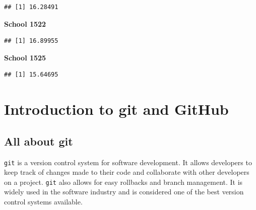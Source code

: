 \documentclass[
  12pt,
]{book}
\newenvironment{Shaded}{\begin{snugshade}}{\end{snugshade}}
\newcommand{\AttributeTok}[1]{\textcolor[rgb]{0.77,0.63,0.00}{#1}}
\newcommand{\DecValTok}[1]{\textcolor[rgb]{0.00,0.00,0.81}{#1}}
\newcommand{\FunctionTok}[1]{\textcolor[rgb]{0.00,0.00,0.00}{#1}}
\newcommand{\NormalTok}[1]{#1}
\newcommand{\SpecialCharTok}[1]{\textcolor[rgb]{0.00,0.00,0.00}{#1}}
\begin{document}
\begin{verbatim}
## [1] 16.28491
\end{verbatim}

\textbf{School 1522}

\begin{Shaded}
\end{Shaded}

\begin{verbatim}
## [1] 16.89955
\end{verbatim}

\textbf{School 1525}

\begin{Shaded}
\end{Shaded}

\begin{verbatim}
## [1] 15.64695
\end{verbatim}

\hypertarget{intro-git}{%
\chapter{Introduction to git and GitHub}\label{intro-git}}

\hypertarget{all-about-git}{%
\section{All about git}\label{all-about-git}}

\texttt{git} is a version control system for software development. It allows developers to keep track of changes made to their code and collaborate with other developers on a project. \texttt{git} also allows for easy rollbacks and branch management. It is widely used in the software industry and is considered one of the best version control systems available.
\end{document}
